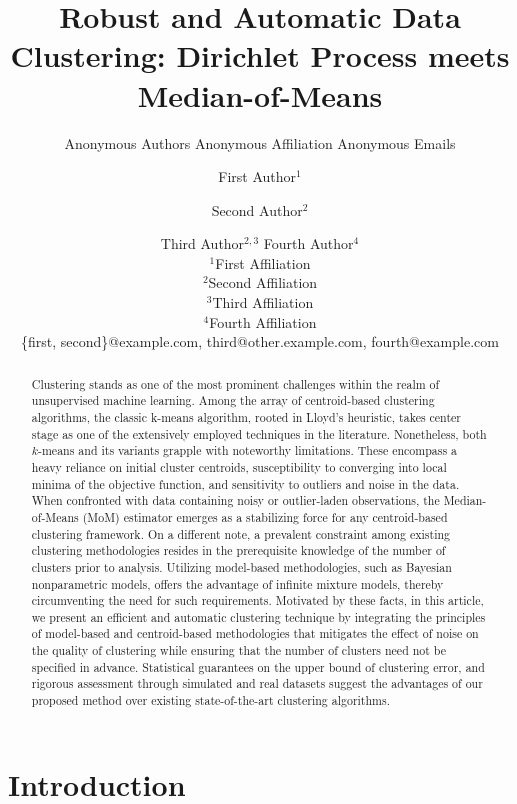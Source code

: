 \documentclass[12pt]{article}
\title{Robust and Automatic Data Clustering: Dirichlet Process meets Median-of-Means}
\author{
    Anonymous Authors
    \affiliations
    Anonymous Affiliation
    \emails
    Anonymous Emails
}
\author{
First Author$^1$
\and
Second Author$^2$\and
Third Author$^{2,3}$\And
Fourth Author$^4$\\
\affiliations
$^1$First Affiliation\\
$^2$Second Affiliation\\
$^3$Third Affiliation\\
$^4$Fourth Affiliation\\
\emails
\{first, second\}@example.com,
third@other.example.com,
fourth@example.com
}
\begin{document}
\maketitle

\begin{abstract}
    Clustering stands as one of the most prominent challenges within the realm of unsupervised machine learning. Among the array of centroid-based clustering algorithms, the classic k-means algorithm, rooted in Lloyd's heuristic, takes center stage as one of the extensively employed techniques in the literature. Nonetheless, both $k$-means and its variants grapple with noteworthy limitations. These encompass a heavy reliance on initial cluster centroids, susceptibility to converging into local minima of the objective function, and sensitivity to outliers and noise in the data. When confronted with data containing noisy or outlier-laden observations, the Median-of-Means (MoM) estimator emerges as a stabilizing force for any centroid-based clustering framework. On a different note, a prevalent constraint among existing clustering methodologies resides in the prerequisite knowledge of the number of clusters prior to analysis. Utilizing model-based methodologies, such as Bayesian nonparametric models, offers the advantage of infinite mixture models, thereby circumventing the need for such requirements. Motivated by these facts, in this article, we present an efficient and automatic clustering technique by integrating the principles of model-based and centroid-based methodologies that mitigates the effect of noise on the quality of clustering while ensuring that the number of clusters need not be specified in advance. Statistical guarantees on the upper bound of clustering error, and rigorous assessment through simulated and real datasets suggest the advantages of our proposed method over existing state-of-the-art clustering algorithms.
\end{abstract}


\section{Introduction}
\label{sec:intro}
\end{document}
